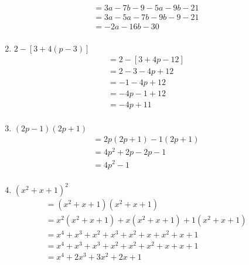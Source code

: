 \documentclass{article}
\begin{document}
\begin{description}
\begin{enumerate}
\begin{equation}
\begin{split}
                          & = 3a - 7b - 9  - 5a - 9b - 21 \\
                          & = 3a - 5a -7b - 9b - 9 - 21 \\
                          & = -2a - 16b - 30 \\
                      \end{split}
                  \end{equation}
            \item $ 2 - [3 + 4(p-3)] $
                  \begin{equation}
                      \begin{split}
                          & = 2 - [3 + 4p - 12] \\
                          & = 2 - 3 - 4p + 12 \\
                          & = -1 - 4p + 12 \\
                          & = -4p -1 + 12 \\
                          & = -4p + 11 \\
                      \end{split}
                  \end{equation}
            \item $(2p - 1) (2p + 1)$
                  \begin{equation}
                      \begin{split}
                          & = 2p(2p+1) -1(2p+1) \\
                          & = 4p^2 + 2p - 2p - 1 \\
                          & = 4p^2 - 1 \\
                      \end{split}
                  \end{equation}
            \item $  (x^2 + x + 1)^2 $
                  \begin{equation}
                      \begin{split}
                          & = (x^2 + x + 1)(x^2 + x + 1) \\
                          & = x^2(x^2 + x + 1)+x(x^2 + x + 1)+1(x^2 + x + 1) \\
                          & = x^4 + x^3 + x^2 + x^3 + x^2 + x + x^2 + x + 1 \\
                          & = x^4 + x^3 + x^3 + x^2 + x^2 + x^2 + x + x + 1 \\
                          & = x^4 + 2x^3 + 3x^2 + 2x + 1 \\

\end{split}
\end{equation}
\end{enumerate}
\end{description}
\end{document}
